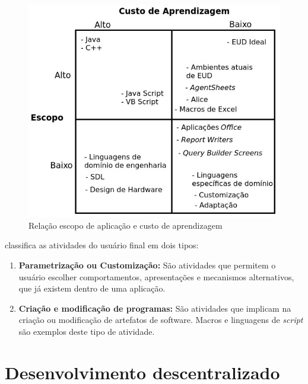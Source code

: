 \begin{figure}[h]
	\centering
	\label{fig01}
		\includegraphics[scale=0.8]{figuras/trade_off_eud_editado}
	\caption{Relação escopo de aplicação e custo de aprendizagem}
\end{figure}
\pagebreak

 classifica as atividades do usuário final em dois tipos:

\begin{enumerate}
\item \textbf{Parametrização ou Customização:} São atividades que permitem o usuário escolher comportamentos, apresentações e mecanismos  alternativos, que já existem dentro de uma aplicação.

\item \textbf{Criação e modificação de programas:} São atividades que implicam na criação ou modificação de artefatos de software. Macros e linguagens de \textit{script} são exemplos deste tipo de atividade.
\end{enumerate}

\section{Desenvolvimento descentralizado}

